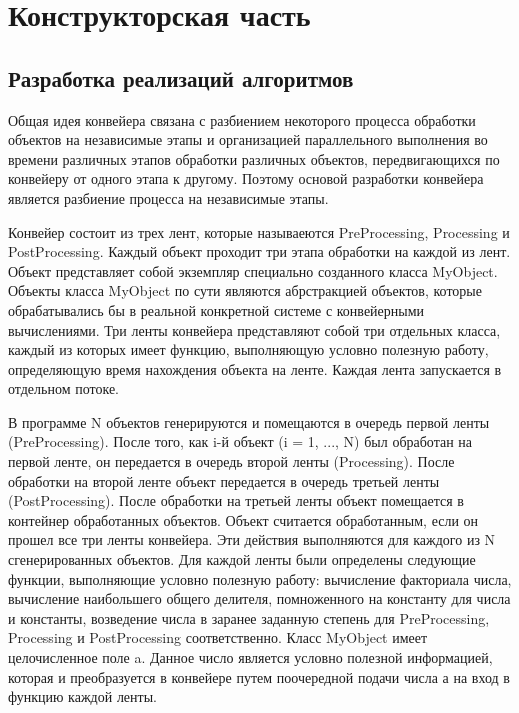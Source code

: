 \documentclass[a4paper,14pt]{report}
\begin{document}
\chapter*{Конструкторская часть}

\section*{Разработка реализаций алгоритмов}

Общая идея конвейера связана с разбиением некоторого процесса обработки объектов на независимые этапы и организацией параллельного выполнения во времени различных этапов обработки различных объектов, передвигающихся по конвейеру от одного этапа к другому.
Поэтому основой разработки конвейера является разбиение процесса на независимые этапы.

Конвейер состоит из трех лент, которые называеются PreProcessing, Processing и PostProcessing. Каждый объект проходит три этапа обработки на каждой из лент. Объект представляет собой экземпляр специально созданного класса MyObject. Объекты класса MyObject по сути являются абрстракцией объектов, которые обрабатывались бы в реальной конкретной системе с конвейерными вычислениями. Три ленты конвейера представляют собой три отдельных класса, каждый из которых имеет функцию, выполняющую условно полезную работу, определяющую время нахождения объекта на ленте. Каждая лента запускается в отдельном потоке.

В программе N объектов генерируются и помещаются в очередь первой ленты (PreProcessing). После того, как i-й объект (i = 1, ..., N) был обработан на первой ленте, он передается в очередь второй ленты (Processing). После обработки на второй ленте объект передается в очередь третьей ленты (PostProcessing). После обработки на третьей ленты объект помещается в контейнер обработанных объектов. Объект считается обработанным, если он прошел все три ленты конвейера. Эти действия выполняются для каждого из N сгенерированных объектов.
Для каждой ленты были определены следующие функции, выполняющие условно полезную работу: вычисление факториала числа, вычисление наибольшего общего делителя, помноженного на константу для числа и константы, возведение числа в заранее заданную степень для PreProcessing, Processing и PostProcessing соответственно. Класс MyObject имеет целочисленное поле a. Данное число является условно полезной информацией, которая и преобразуется в конвейере путем поочередной подачи числа а на вход в функцию каждой ленты. 
\end{document}
